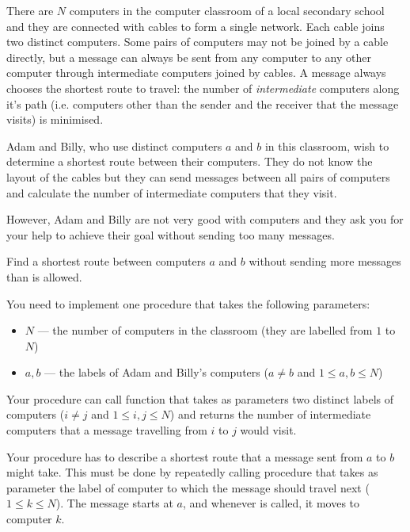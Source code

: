 \documentclass{boi2014}
\begin{document}
    There are $N$ computers in the computer classroom of a local secondary
    school and they are connected with cables to form a single network. Each
    cable joins two distinct computers.  Some pairs of computers may not be
    joined by a cable directly, but a message can always be sent from any
    computer to any other computer through intermediate computers joined by
    cables.  A message always chooses the shortest route to travel: the number
    of \emph{intermediate} computers along it's path (i.e. computers other than
    the sender and the receiver that the message visits) is minimised.
    
    Adam and Billy, who use distinct computers $a$ and $b$ in this classroom,
    wish to determine a shortest route between their computers.  They do not
    know the layout of the cables but they can send messages between all pairs
    of computers and calculate the number of intermediate computers that they
    visit.

    However, Adam and Billy are not very good with computers
    and they ask you for your help to achieve their goal without sending
    too many messages.

    \Task
    Find a shortest route between computers $a$ and $b$ without
    sending more messages than is allowed.

    \Implementation
    You need to implement one procedure  that
    takes the following parameters:

    \begin{itemize}
        \item $N$ --- the number of computers in the classroom
            (they are labelled from $1$ to $N$)
        \item $a, b$ --- the labels of Adam and Billy's computers
            ($a \neq b$ and $1 \le a, b \le N$)
    \end{itemize}

    Your procedure  can call function 
    that takes as parameters two distinct labels of computers
    ($i \neq j$ and $1 \le i, j \le N$) and returns the number of intermediate computers
    that a message travelling from $i$ to $j$ would visit.

    Your procedure  has to describe a shortest route
    that a message sent from $a$ to $b$ might take. This must be done by
    repeatedly calling procedure  that takes as
    parameter the label of computer to which the message should travel
    next ($1 \le k \le N$). The message starts at $a$, and whenever
     is called, it moves to computer $k$.
\end{document}
